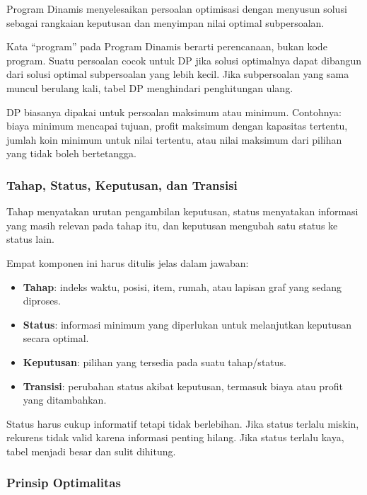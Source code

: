 \begin{jawab}
Program Dinamis menyelesaikan persoalan optimisasi dengan menyusun solusi sebagai rangkaian keputusan dan menyimpan nilai optimal subpersoalan.
\end{jawab}

Kata ``program'' pada Program Dinamis berarti perencanaan, bukan kode program. Suatu persoalan cocok untuk DP jika solusi optimalnya dapat dibangun dari solusi optimal subpersoalan yang lebih kecil. Jika subpersoalan yang sama muncul berulang kali, tabel DP menghindari penghitungan ulang.

DP biasanya dipakai untuk persoalan maksimum atau minimum. Contohnya: biaya minimum mencapai tujuan, profit maksimum dengan kapasitas tertentu, jumlah koin minimum untuk nilai tertentu, atau nilai maksimum dari pilihan yang tidak boleh bertetangga.

\subsubsection{Tahap, Status, Keputusan, dan Transisi}

\begin{jawab}
Tahap menyatakan urutan pengambilan keputusan, status menyatakan informasi yang masih relevan pada tahap itu, dan keputusan mengubah satu status ke status lain.
\end{jawab}

Empat komponen ini harus ditulis jelas dalam jawaban:
\begin{itemize}
    \item \textbf{Tahap}: indeks waktu, posisi, item, rumah, atau lapisan graf yang sedang diproses.
    \item \textbf{Status}: informasi minimum yang diperlukan untuk melanjutkan keputusan secara optimal.
    \item \textbf{Keputusan}: pilihan yang tersedia pada suatu tahap/status.
    \item \textbf{Transisi}: perubahan status akibat keputusan, termasuk biaya atau profit yang ditambahkan.
\end{itemize}

Status harus cukup informatif tetapi tidak berlebihan. Jika status terlalu miskin, rekurens tidak valid karena informasi penting hilang. Jika status terlalu kaya, tabel menjadi besar dan sulit dihitung.

\subsubsection{Prinsip Optimalitas}

